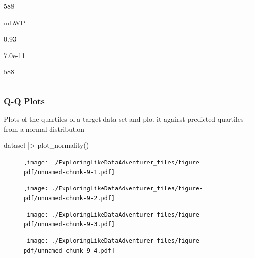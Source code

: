 \documentclass[
  letterpaper,
  DIV=11,
  numbers=noendperiod]{scrreprt}
\newenvironment{Shaded}{\begin{snugshade}}{\end{snugshade}}
\newcommand{\FunctionTok}[1]{\textcolor[rgb]{0.28,0.35,0.67}{#1}}
\newcommand{\NormalTok}[1]{\textcolor[rgb]{0.00,0.23,0.31}{#1}}
\newcommand{\SpecialCharTok}[1]{\textcolor[rgb]{0.37,0.37,0.37}{#1}}
\begin{document}
588

mLWP

0.93

7.0e-11

588

\begin{center}\rule{0.5\linewidth}{0.5pt}\end{center}

\hypertarget{q-q-plots}{%
\subsubsection{Q-Q Plots}\label{q-q-plots}}

Plots of the quartiles of a target data set and plot it against
predicted quartiles from a normal distribution

\begin{Shaded}
\begin{Highlighting}[]
\NormalTok{dataset }\SpecialCharTok{|\textgreater{}}
\FunctionTok{plot\_normality}\NormalTok{()}
\end{Highlighting}
\end{Shaded}

\begin{figure}[H]

{\centering \texttt{[image: ./ExploringLikeDataAdventurer\_files/figure-pdf/unnamed-chunk-9-1.pdf]}

}

\end{figure}

\begin{figure}[H]

{\centering \texttt{[image: ./ExploringLikeDataAdventurer\_files/figure-pdf/unnamed-chunk-9-2.pdf]}

}

\end{figure}

\begin{figure}[H]

{\centering \texttt{[image: ./ExploringLikeDataAdventurer\_files/figure-pdf/unnamed-chunk-9-3.pdf]}

}

\end{figure}

\begin{figure}[H]

{\centering \texttt{[image: ./ExploringLikeDataAdventurer\_files/figure-pdf/unnamed-chunk-9-4.pdf]}

}

\end{figure}
\end{document}
